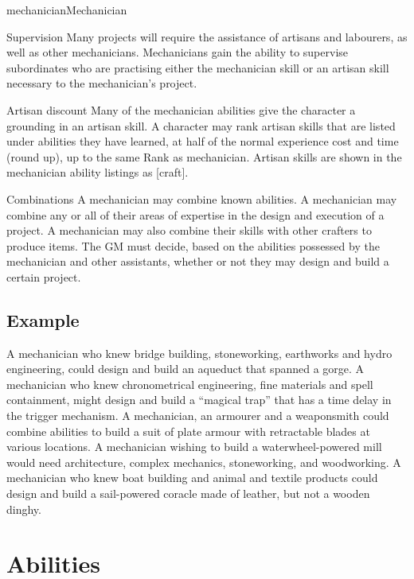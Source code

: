 \begin{Skill}[2.2]{mechanician}{Mechanician}
\begin{Description}
\item[Supervision] Many projects will require the assistance of
  artisans and labourers, as well as other mechanicians.  Mechanicians
  gain the ability to supervise subordinates who are practising either
  the mechanician skill or an artisan skill necessary to the
  mechanician’s project.

\item[Artisan] discount Many of the mechanician abilities give the
  character a grounding in an artisan skill.  A character may rank
  artisan skills that are listed under abilities they have learned, at
  half of the normal experience cost and time (round up), up to the
  same Rank as mechanician. Artisan skills are shown in the
  mechanician ability listings as [craft].

\item[Combinations] A mechanician may combine known abilities.  A
  mechanician may combine any or all of their areas of expertise in
  the design and execution of a project.  A mechanician may also
  combine their skills with other crafters to produce items. The GM
  must decide, based on the abilities possessed by the mechanician and
  other assistants, whether or not they may design and build a certain
  project.

\end{Description}


\subsection{Example}

A mechanician who knew bridge building, stoneworking, earthworks and
hydro engineering, could design and build an aqueduct that spanned a
gorge.  A mechanician who knew chronometrical engineering, fine
materials and spell containment, might design and build a “magical
trap” that has a time delay in the trigger mechanism.  A mechanician,
an armourer and a weaponsmith could combine abilities to build a suit
of plate armour with retractable blades at various locations.  A
mechanician wishing to build a waterwheel-powered mill would need
architecture, complex mechanics, stoneworking, and woodworking.  A
mechanician who knew boat building and animal and textile products
could design and build a sail-powered coracle made of leather, but not
a wooden dinghy.

\section{Abilities}


\end{Skill}
